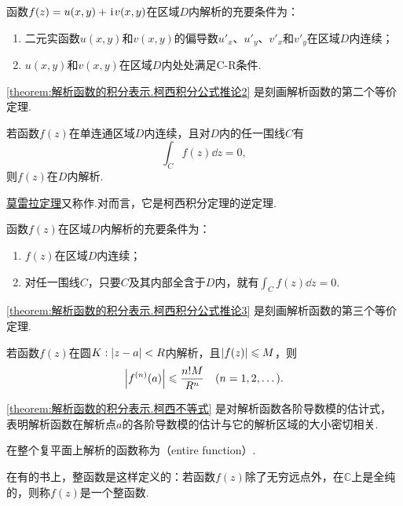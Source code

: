 \begin{corollary}\label{theorem:解析函数的积分表示.柯西积分公式推论2}
函数\(f(z)=u(x,y)+\kern1pt\mathrm{i}\kern1pt v(x,y)\)在区域\(D\)内解析的充要条件为：
\begin{enumerate}
\item 二元实函数\(u(x,y)\)和\(v(x,y)\)的偏导数\(u'_x\)、\(u'_y\)、\(v'_x\)和\(v'_y\)在区域\(D\)内连续；
\item \(u(x,y)\)和\(v(x,y)\)在区域\(D\)内处处满足C-R条件.
\end{enumerate}
\end{corollary}
\cref{theorem:解析函数的积分表示.柯西积分公式推论2} 是刻画解析函数的第二个等价定理.

\begin{theorem}\label{theorem:解析函数的积分表示.莫雷拉定理}
若函数\(f(z)\)在单连通区域\(D\)内连续，且对\(D\)内的任一围线\(C\)有\[
\int_C f(z) \dd{z} = 0,
\]则\(f(z)\)在\(D\)内解析.
\end{theorem}
\hyperref[theorem:解析函数的积分表示.莫雷拉定理]{莫雷拉定理}又称作.对而言，它是柯西积分定理的逆定理.

\begin{theorem}\label{theorem:解析函数的积分表示.柯西积分公式推论3}
函数\(f(z)\)在区域\(D\)内解析的充要条件为：
\begin{enumerate}
\item \(f(z)\)在区域\(D\)内连续；
\item 对任一围线\(C\)，只要\(C\)及其内部全含于\(D\)内，就有\(\int_C f(z) \dd{z} = 0\).
\end{enumerate}
\end{theorem}
\cref{theorem:解析函数的积分表示.柯西积分公式推论3} 是刻画解析函数的第三个等价定理.

\begin{theorem}[柯西不等式]
若函数\(f(z)\)在圆\(K: \abs{z-a}<R\)内解析，且\(\abs{f(z)} \leqslant M\)，则\begin{equation}\label{theorem:解析函数的积分表示.柯西不等式}
\abs{f^{(n)}(a)} \leqslant \frac{n! M}{R^n}
\quad(n=1,2,\dots).
\end{equation}
\end{theorem}
\cref{theorem:解析函数的积分表示.柯西不等式} 是对解析函数各阶导数模的估计式，表明解析函数在解析点\(a\)的各阶导数模的估计与它的解析区域的大小密切相关.

\begin{definition}
在整个复平面上解析的函数称为（entire function）.
\end{definition}
在有的书上，整函数是这样定义的：若函数\(f(z)\)除了无穷远点外，在\(\mathbb{C}\)上是全纯的，则称\(f(z)\)是一个整函数.

